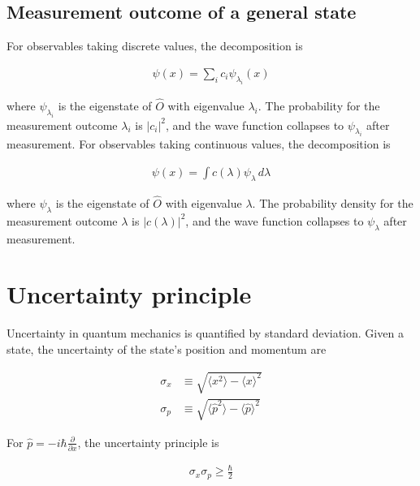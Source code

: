 \documentclass[12pt]{book} %
\numberwithin{equation}{chapter}
\def\s{\sigma}
\def\p{\partial}
\begin{document}
\subsection*{Measurement outcome of a general state}
For observables taking discrete values, the decomposition is
\begin{eqnbox}
\begin{align}
\psi(x)=\sum_{i}c_{i}\psi_{\lambda_{i}}(x)
\end{align}
\end{eqnbox}
where $\psi_{\lambda_{i}}$ is the eigenstate of $\hat{O}$ with eigenvalue $\lambda_{i}$. The probability for the measurement outcome $\lambda_{i}$ is ${\left|c_{i}\right|}^{2}$, and the wave function collapses to $\psi_{\lambda_{i}}$ after measurement.\bigskip\newline
For observables taking continuous values, the decomposition is
\begin{eqnbox}
\begin{align}
\psi(x)=\int c(\lambda)\psi_{\lambda}\,d\lambda
\end{align}
\end{eqnbox}
where $\psi_{\lambda}$ is the eigenstate of $\hat{O}$ with eigenvalue $\lambda$. The probability density for the measurement outcome $\lambda$ is ${\left|c(\lambda)\right|}^{2}$, and the wave function collapses to $\psi_{\lambda}$ after measurement.

\section{Uncertainty principle}
Uncertainty in quantum mechanics is quantified by standard deviation. Given a state, the uncertainty of the state's position and momentum are
\begin{eqnbox}
\begin{align}
\s_{x}&\equiv\sqrt{\langle x^{2}\rangle-{\langle x\rangle}^{2}}\\
\s_{p}&\equiv\sqrt{\langle \hat{p}^{2}\rangle-{\langle \hat{p}\rangle}^{2}}
\end{align}
\end{eqnbox}
For $\hat{p}=-i\hbar\frac{\p}{\p x}$, the uncertainty principle is
\begin{eqnbox}
\begin{align}
\s_{x}\s_{p}\geq \frac{\hbar}{2}
\end{align}
\end{eqnbox}
\end{document}
